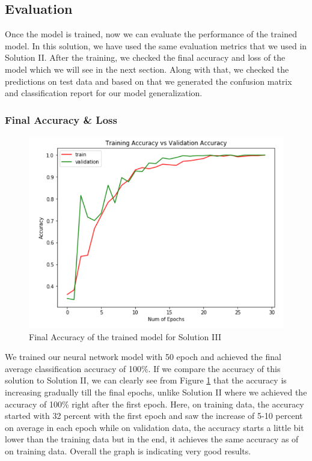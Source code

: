 \subsection{Evaluation}
Once the model is trained, now we can evaluate the performance of the trained model. In this solution, we have used the same evaluation metrics that we used in Solution II. After the training, we checked the final accuracy and loss of the model which we will see in the next section. Along with that, we checked the predictions on test data and based on that we generated the confusion matrix and classification report for our model generalization.
\subsubsection{Final Accuracy \& Loss}
\begin{figure}[H]
\centering
\includegraphics[scale=0.8]{images/Chapter5/sol_3/ac3_sol3.png}
\caption{Final Accuracy of the trained model for Solution III }
\label{acc_sol3}
\end{figure}
\par
We trained our neural network model with 50 epoch and achieved the final average classification accuracy of 100\%. If we compare the accuracy of this solution to Solution II, we can clearly see from Figure \ref{acc_sol3} that the accuracy is increasing gradually till the final epochs, unlike Solution II where we achieved the accuracy of 100\% right after the first epoch. Here, on training data, the accuracy started with 32 percent with the first epoch and saw the increase of 5-10 percent on average in each epoch while on validation data, the accuracy starts a little bit lower than the training data but in the end, it achieves the same accuracy as of on training data. Overall the graph is indicating very good results.
